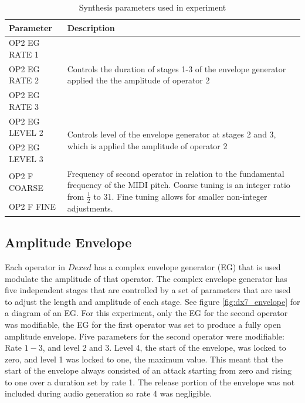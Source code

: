 \begin{table}[ht]
\centering
\caption{Synthesis parameters used in experiment}
\label{tbl:dexed-params}
\begin{tabular}{l|l}
\toprule
Parameter     & Description                                                                                  \\
\midrule
OP2 EG RATE 1 & \multirow{3}{*}{\parbox{0.70\linewidth}{Controls the duration of stages 1-3 of the envelope generator applied the the amplitude of operator 2}} \\
OP2 EG RATE 2 \\
OP2 EG RATE 3 \\
\midrule
OP2 EG LEVEL 2 & \multirow{2}{*}{\parbox{0.6\linewidth}{Controls level of the envelope generator at stages 2 and 3, which is applied the amplitude of operator 2}} \\
OP2 EG LEVEL 3 \\
\midrule
OP2 F COARSE & \multirow{2}{*}{\parbox{0.6\linewidth}{Frequency of second operator in relation to the fundamental frequency of the MIDI pitch. Coarse tuning is an integer ratio from $\frac{1}{2}$ to 31. Fine tuning allows for smaller non-integer adjustments.}} \\[2.75ex]
OP2 F FINE \\[2.75ex]
\bottomrule                                                                                        
\end{tabular}
\end{table}
\vspace{1cm}

\subsection{Amplitude Envelope}
Each operator in $Dexed$ has a complex envelope generator (EG) that is used modulate the amplitude of that operator. The complex envelope generator has five independent stages that are controlled by a set of parameters that are used to adjust the length and amplitude of each stage. See figure \ref{fig:dx7_envelope} for a diagram of an EG. For this experiment, only the EG for the second operator was modifiable, the EG for the first operator was set to produce a fully open amplitude envelope. Five parameters for the second operator were modifiable: Rate $1-3$, and level 2 and 3. Level 4, the start of the envelope, was locked to zero, and level 1 was locked to one, the maximum value. This meant that the start of the envelope always consisted of an attack starting from zero and rising to one over a duration set by rate 1. The release portion of the envelope was not included during audio generation so rate 4 was negligible.

